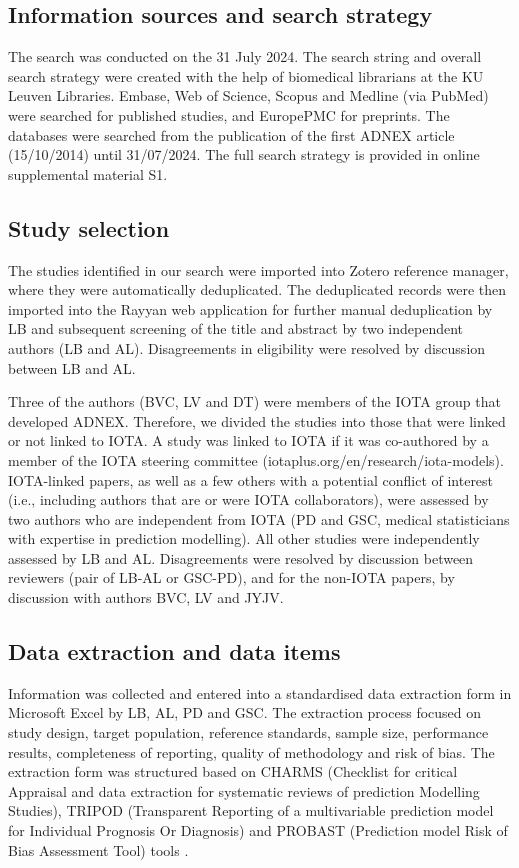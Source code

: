 \subsection{Information sources and search strategy}
The search was conducted on the 31 July 2024. The search string and overall search
strategy were created with the help of biomedical librarians at the KU Leuven
Libraries. Embase, Web of Science, Scopus and Medline (via PubMed) were searched for
published studies, and EuropePMC for preprints. The databases were searched from the
publication of the first \gls{ADNEX} article (15/10/2014) until 31/07/2024. The full
search strategy is provided in online supplemental material S1.

\subsection{Study selection}
The studies identified in our search were imported into Zotero reference manager,
where they were automatically deduplicated. The deduplicated records were then
imported into the Rayyan web application for further manual deduplication by LB and
subsequent screening of the title and abstract by two independent authors (LB and
AL). Disagreements in eligibility were resolved by discussion between LB and AL.

Three of the authors (BVC, LV and DT) were members of the \gls{IOTA} group that developed
\gls{ADNEX}. Therefore, we divided the studies into those that were linked or not linked to
\gls{IOTA}. A study was linked to \gls{IOTA} if it was co-authored by a member of the \gls{IOTA}
steering committee (iotaplus.org/en/research/iota-models). \gls{IOTA}-linked papers, as
well as a few others with a potential conflict of interest (i.e., including authors
that are or were \gls{IOTA} collaborators), were assessed by two authors who are
independent from \gls{IOTA} (PD and GSC, medical statisticians with expertise in prediction
modelling). All other studies were independently assessed by LB and AL. Disagreements
were resolved by discussion between reviewers (pair of LB-AL or GSC-PD), and for the
non-\gls{IOTA} papers, by discussion with authors BVC, LV and JYJV.

\subsection{Data extraction and data items}
Information was collected and entered into a standardised data extraction form in
Microsoft Excel by LB, AL, PD and GSC. The extraction process focused on study
design, target population, reference standards, sample size, performance results,
completeness of reporting, quality of methodology and risk of bias. The extraction
form was structured based on \gls{CHARMS} (Checklist for critical Appraisal and data
extraction for systematic reviews of prediction Modelling Studies), \gls{TRIPOD}
(Transparent Reporting of a multivariable prediction model for Individual Prognosis
Or Diagnosis) and \gls{PROBAST} (Prediction model Risk of Bias Assessment Tool) tools
 \cite{moonsCriticalAppraisalData2014,collinsTransparentReportingMultivariable2015,moonsPROBASTToolAssess2019}.

